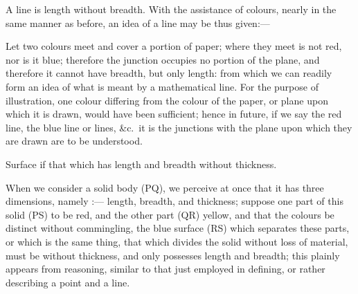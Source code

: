 \documentclass[booklanguage=english]{byrnebook}
\begin{document}
A line is length without breadth. With the assistance of colours, nearly in the same manner as before, an idea of a line may be thus given:—

\drawCurrentPictureInMargin
Let two colours meet and cover a portion of paper; where they meet is not red, nor is it blue; therefore the junction occupies no portion of the plane, and therefore it cannot have breadth, but only length: from which we can readily form an idea of what is meant by a mathematical line. For the purpose of illustration, one colour differing from the colour of the paper, or plane upon which it is drawn, would have been sufficient; hence in future, if we say the red line, the blue line or lines, \&c.\ it is the junctions with the plane upon which they are drawn are to be understood.

\drawCurrentPictureInMargin
Surface if that which has length and breadth without thickness.

When we consider a solid body (PQ), we perceive at once that it has three dimensions, namely :— length, breadth, and thickness; suppose one part of this solid (PS) to be red, and the other part (QR) yellow, and that the colours be distinct without commingling, the blue surface (RS) which separates these parts, or which is the same thing, that which divides the solid without loss of material, must be without thickness, and only possesses length and breadth; this plainly appears from reasoning, similar to that just employed in defining, or rather describing a point and a line.
\end{document}
